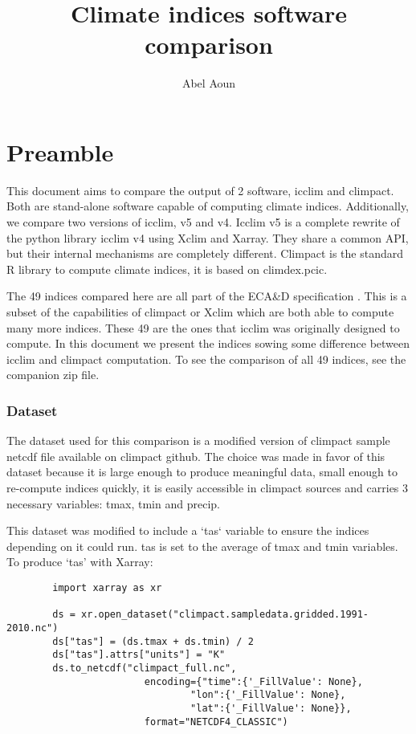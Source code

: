 \documentclass[a4paper,11pt]{article}
\title{Climate indices software comparison}
\author{Abel Aoun}
\begin{document}
\maketitle
\part*{Preamble}
    This document aims to compare the output of 2 software, icclim \cite{gh/icclim} and climpact\cite{gh/climpact}. Both are stand-alone software capable of computing climate indices.
    Additionally, we compare two versions of icclim, v5 and v4.
    Icclim v5 is a complete rewrite of the python library icclim v4 using Xclim\cite{gh/xclim} and Xarray\cite{gh/xarray}. They share a common API, but their internal mechanisms are completely different.
    Climpact is the standard R library to compute climate indices, it is based on climdex.pcic\cite{gh/climdex}.

    The 49 indices compared here are all part of the ECA\&D specification
    \cite{doc/ecad_new}.
    This is a subset of the capabilities of climpact or Xclim which are both able to compute many 
    more indices.
    These 49 are the ones that icclim was originally designed to compute.
    In this document we present the indices sowing some difference between icclim and climpact computation.
    To see the comparison of all 49 indices, see the companion zip file.
\section{Dataset}
    The dataset used for this comparison is a modified version of climpact sample netcdf file available on climpact github\cite{gh/climpact}.
    The choice was made in favor of this dataset because it is large enough to produce meaningful data,
    small enough to re-compute indices quickly, it is easily accessible in climpact sources and carries 3 necessary variables: tmax, tmin and precip.

    This dataset was modified to include a `tas` variable to ensure the indices depending on it could
    run. tas is set to the average of tmax and tmin variables.
    To produce `tas' with Xarray:
    \begin{lstlisting}
        import xarray as xr

        ds = xr.open_dataset("climpact.sampledata.gridded.1991-2010.nc")
        ds["tas"] = (ds.tmax + ds.tmin) / 2
        ds["tas"].attrs["units"] = "K"
        ds.to_netcdf("climpact_full.nc",
                        encoding={"time":{'_FillValue': None},
                                "lon":{'_FillValue': None},
                                "lat":{'_FillValue': None}},
                        format="NETCDF4_CLASSIC")
    \end{lstlisting}
\end{document}

